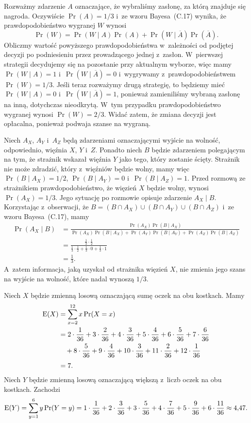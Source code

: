 \exercise %
Rozważmy zdarzenie $A$ oznaczające, że wybraliśmy zasłonę, za którą znajduje się nagroda. Oczywiście $\Pr(A)=1/3$ i~ze wzoru Bayesa~(C.17) wynika, że prawdopodobieństwo wygranej $W$ wynosi
\[
	\Pr(W) = \Pr(W\mid A)\Pr(A)+\Pr(W\mid\overline{A})\Pr(\overline{A}).
\]
Obliczmy wartość powyższego prawdopodobieństwa w~zależności od podjętej decyzji po podniesieniu przez prowadzącego jednej z~zasłon. W~pierwszej strategii decydujemy się na pozostanie przy aktualnym wyborze, więc mamy $\Pr(W\mid A)=1$ i~$\Pr(W\mid\overline{A})=0$ i~wygrywamy z~prawdopodobieństwem $\Pr(W)=1/3$. Jeśli teraz rozważymy drugą strategię, to będziemy mieć $\Pr(W\mid A)=0$ i~$\Pr(W\mid\overline{A})=1$, ponieważ zamieniliśmy wybraną zasłonę na inną, dotychczas nieodkrytą. W~tym przypadku prawdopodobieństwo wygranej wynosi $\Pr(W)=2/3$. Widać zatem, że zmiana decyzji jest opłacalna, ponieważ podwaja szanse na wygraną.

\exercise %
Niech $A_X$, $A_Y$ i~$A_Z$ będą zdarzeniami oznaczającymi wyjście na wolność, odpowiednio, więźnia $X$, $Y$ i~$Z$. Ponadto niech $B$ będzie zdarzeniem polegającym na tym, że strażnik wskazał więźnia $Y$ jako tego, który zostanie ścięty. Strażnik nie może zdradzić, który z~więźniów będzie wolny, mamy więc $\Pr(B\mid A_X)=1/2$, $\Pr(B\mid A_Y)=0$ i~$\Pr(B\mid A_Z)=1$. Przed rozmową ze strażnikiem prawdopodobieństwo, że więzień $X$ będzie wolny, wynosi $\Pr(A_X)=1/3$. Jego sytuację po rozmowie opisuje zdarzenie $A_X\mid B$. Korzystając z~obserwacji, że $B=(B\cap A_X)\cup(B\cap A_Y)\cup(B\cap A_Z)$ i~ze wzoru Bayesa~(C.17), mamy
\begin{align*}
    \Pr(A_X\mid B) &= \frac{\Pr(A_X)\Pr(B\mid A_X)}{\Pr(A_X)\Pr(B\mid A_X)+\Pr(A_Y)\Pr(B\mid A_Y)+\Pr(A_Z)\Pr(B\mid A_Z)} \\
	&= \frac{\frac{1}{3}\cdot\frac{1}{2}}{\frac{1}{3}\cdot\frac{1}{2}+\frac{1}{3}\cdot0+\frac{1}{3}\cdot1} \\[2mm]
	&= \frac{1}{3}.
\end{align*}
A~zatem informacja, jaką uzyskał od strażnika więzień $X$, nie zmienia jego szans na wyjście na wolność, które nadal wynoszą $1/3$.


\exercise %
Niech $X$ będzie zmienną losową oznaczającą sumę oczek na obu kostkach. Mamy
\begin{align*}
	\operatorname{E}(X) &= \sum_{x=2}^{12}x\Pr(X=x) \\
	&= 2\cdot\frac{1}{36}+3\cdot\frac{2}{36}+4\cdot\frac{3}{36}+5\cdot\frac{4}{36}+6\cdot\frac{5}{36}+7\cdot\frac{6}{36} \\
	&\quad {}+8\cdot\frac{5}{36}+9\cdot\frac{4}{36}+10\cdot\frac{3}{36}+11\cdot\frac{2}{36}+12\cdot\frac{1}{36} \\[1mm]
	&= 7.
\end{align*}
Niech $Y$ będzie zmienną losową oznaczającą większą z~liczb oczek na obu kostkach. Zachodzi
\[
	\operatorname{E}(Y) = \sum_{y=1}^{6}y\Pr(Y=y) = 1\cdot\frac{1}{36}+2\cdot\frac{3}{36}+3\cdot\frac{5}{36}+4\cdot\frac{7}{36}+5\cdot\frac{9}{36}+6\cdot\frac{11}{36} \approx 4{,}47.
\]

